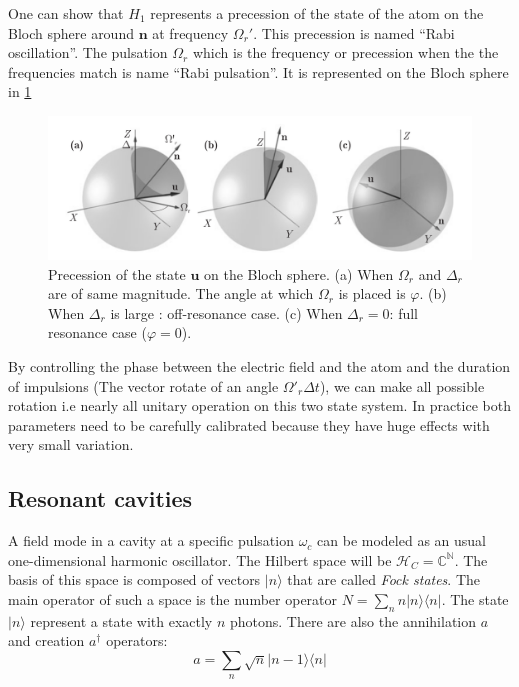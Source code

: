 \documentclass[10pt,a4paper]{report}
\theoremstyle{plain}
\theoremstyle{definition}
\theoremstyle{remark}
\newcommand{\N}{\ensuremath{\mathbb{N}}}
\newcommand{\C}{\ensuremath{\mathbb{C}}}
\newcommand{\TODO}{\textbf{TODO}}
\newcommand{\ket}[1]{|#1\rangle}
\newcommand{\bra}[1]{\langle#1|}
\newcommand{\bs}{\boldsymbol}
\begin{document}
One can show that $H_1$ represents a precession of the state of the atom on the
Bloch sphere around $\bs n$ at frequency $\Omega_r'$. This precession is named
``Rabi oscillation''. The pulsation $\Omega_r$ which is the frequency or
precession when the the frequencies match is name ``Rabi pulsation''. It is
represented on the Bloch sphere in \cref{fig:rabi}

\begin{figure}
  \includegraphics[width=\textwidth]{Rabi.png}
  \caption{
    Precession of the state $\bs u$ on the Bloch sphere. (a) When
    $\Omega_r$ and $\Delta_r$ are of same magnitude. The angle at which
    $\Omega_r$ is placed is $\varphi$. (b) When $\Delta_r$ is large :
    off-resonance case. (c) When $\Delta_r =0$: full resonance case ($\varphi
    = 0$).
}
  \label{fig:rabi}
\end{figure}

By controlling the phase between the electric field and the atom and the
duration of impulsions (The vector rotate of an angle $\Omega'_r\Delta t$), we
can make all possible rotation i.e nearly all unitary operation on this two
state system. In practice both parameters need to be carefully calibrated
because they have huge effects with very small variation.

\subsection{Resonant cavities}\label{ssec:rescav}


A field mode in a cavity at a specific pulsation $\omega_c$ can be modeled
as an usual one-dimensional harmonic oscillator. The Hilbert space will be
$\mathcal{H}_C = \C^\N$.
The basis of this space is composed of vectors $\ket n$
that are called \emph{Fock states}. The main operator of such a space is the
number operator $N = \sum_n n\ket n \bra n$. The state $\ket n$ represent a
state with exactly $n$ photons. There are also the annihilation $a$ and creation $a^\dagger$ operators:
\[a = \sum_n \sqrt{n} \ket {n-1} \bra{n}\]
\end{document}
